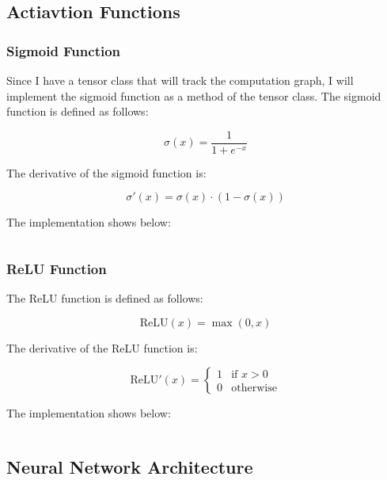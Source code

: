 \subsection{Actiavtion Functions}

\subsubsection{Sigmoid Function}

Since I have a tensor class that will track the computation graph, I will implement the sigmoid function as a method of the tensor class. The sigmoid function is defined as follows:

\begin{equation}
    \sigma(x) = \frac{1}{1 + e^{-x}}
\end{equation}

The derivative of the sigmoid function is:

\begin{equation}
    \sigma'(x) = \sigma(x) \cdot (1 - \sigma(x))
\end{equation}

The implementation shows below:

\inputminted[firstline=23, lastline=38]{python}{../FakeTorch/nn/activation.py}


\subsubsection{ReLU Function}

The ReLU function is defined as follows:

\begin{equation}
    \text{ReLU}(x) = \max(0, x)
\end{equation}

The derivative of the ReLU function is:

\begin{equation}
    \text{ReLU}'(x) = \begin{cases}
        1 & \text{if } x > 0 \\
        0 & \text{otherwise}
    \end{cases}
\end{equation}

The implementation shows below:

\inputminted[firstline=6, lastline=20]{python}{../FakeTorch/nn/activation.py}

\subsection{Neural Network Architecture}


